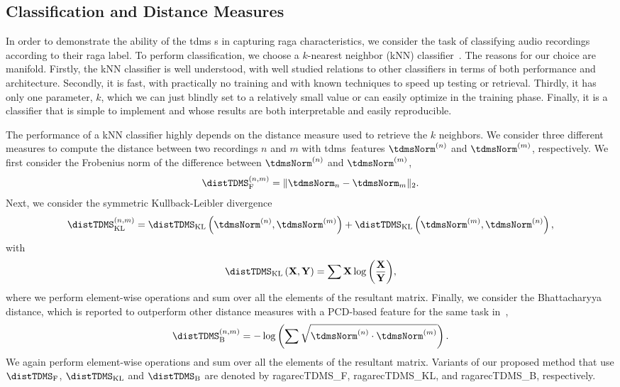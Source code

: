 \subsection{Classification and Distance Measures}
\label{sec:tdms_classification_evaluation}

In order to demonstrate the ability of the \gls{tdms} s in capturing \gls{raga} characteristics, we consider the task of classifying audio recordings according to their \gls{raga} label. To perform classification, we choose a $k$-nearest neighbor (kNN) classifier~\cite{Mitchell97BOOK}. The reasons for our choice are manifold. Firstly, the kNN classifier is well understood, with well studied relations to other classifiers in terms of both performance and architecture. Secondly, it is fast, with practically no training and with known techniques to speed up testing or retrieval. Thirdly, it has only one parameter, $k$, which we can just blindly set to a relatively small value or can easily optimize in the training phase. Finally, it is a classifier that is simple to implement and whose results are both interpretable and easily reproducible. 

The performance of a kNN classifier highly depends on the distance measure used to retrieve the $k$ neighbors. We consider three different measures to compute the distance between two recordings $n$ and $m$ with \gls{tdms}\ features $\tdmsNorm^{(n)}$ and $\tdmsNorm^{(m)}$, respectively. We first consider the Frobenius norm of the difference between $\tdmsNorm^{(n)}$ and $\tdmsNorm^{(m)}$,
\begin{equation*}
\distTDMS_{\mathrm{F}}^{(n,m)} = \norm{\tdmsNorm_{n} - \tdmsNorm_{m}}_2 .
\end{equation*}
Next, we consider the symmetric Kullback-Leibler divergence
\begin{equation*}
\distTDMS_{\mathrm{KL}}^{(n,m)} = \distTDMS_{\mathrm{KL}}\left(\tdmsNorm^{(n)},\tdmsNorm^{(m)}\right) + \distTDMS_{\mathrm{KL}}\left(\tdmsNorm^{(m)},\tdmsNorm^{(n)}\right) ,
\end{equation*}
with
\begin{equation*}
\distTDMS_{\mathrm{KL}}\left(\mathbf{X},\mathbf{Y}\right) = \sum{\mathbf{X} \log\left(\frac{\mathbf{X}}{\mathbf{Y}} \right)} ,
\end{equation*}
where we perform element-wise operations and sum over all the elements of the resultant matrix. Finally, we consider the Bhattacharyya distance, which is reported to outperform other distance measures with a PCD-based feature for the same task in~\cite{chordia2013joint},
\begin{equation*}
\distTDMS_{\mathrm{B}}^{(n,m)} = -\log\left( \sum{ \sqrt{ \tdmsNorm^{(n)} \cdot \tdmsNorm^{(m)} } } \right) .
\end{equation*}
We again perform element-wise operations and sum over all the elements of the resultant matrix. Variants of our proposed method that use $\distTDMS_{\mathrm{F}}$, $\distTDMS_{\mathrm{KL}}$ and $\distTDMS_{\mathrm{B}}$ are denoted by \acrshort{ragarecTDMS_F}, \acrshort{ragarecTDMS_KL}, and \acrshort{ragarecTDMS_B}, respectively.



